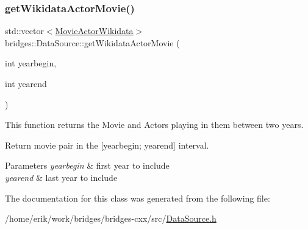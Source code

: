 \subsubsection{\texorpdfstring{get\+Wikidata\+Actor\+Movie()}{getWikidataActorMovie()}}
{\footnotesize\ttfamily std\+::vector$<$\hyperlink{classbridges_1_1dataset_1_1_movie_actor_wikidata}{Movie\+Actor\+Wikidata}$>$ bridges\+::\+Data\+Source\+::get\+Wikidata\+Actor\+Movie (\begin{DoxyParamCaption}\item[{int}]{yearbegin,  }\item[{int}]{yearend }\end{DoxyParamCaption})\hspace{0.3cm}{\ttfamily [inline]}}



This function returns the Movie and Actors playing in them between two years. 

Return movie pair in the \mbox{[}yearbegin; yearend\mbox{]} interval.


\begin{DoxyParams}{Parameters}
{\em yearbegin} & first year to include \\
\hline
{\em yearend} & last year to include \\
\hline
\end{DoxyParams}


The documentation for this class was generated from the following file\+:\begin{DoxyCompactItemize}
\item 
/home/erik/work/bridges/bridges-\/cxx/src/\hyperlink{_data_source_8h}{Data\+Source.\+h}\end{DoxyCompactItemize}
